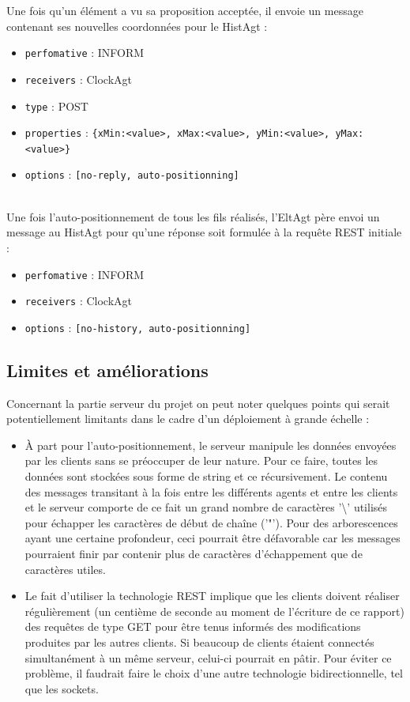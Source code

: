 Une fois qu'un élément a vu sa proposition acceptée, il envoie un message contenant ses nouvelles coordonnées pour le HistAgt :
\begin{itemize}
	\item \lstinline$perfomative$ : INFORM
	\item \lstinline$receivers$ : ClockAgt
	\item \lstinline$type$ : POST
	\item \lstinline$properties$ : \lstinline${xMin:<value>, xMax:<value>, yMin:<value>, yMax:<value>}$
	\item \lstinline$options$ : \lstinline$[no-reply, auto-positionning]$
\end{itemize}
~\\
Une fois l'auto-positionnement de tous les fils réalisés, l'EltAgt père envoi un message au HistAgt pour qu'une réponse soit formulée à la requête REST initiale :
\begin{itemize}
	\item \lstinline$perfomative$ : INFORM
	\item \lstinline$receivers$ : ClockAgt
	\item \lstinline$options$ : \lstinline$[no-history, auto-positionning]$
\end{itemize}

\subsection{Limites et améliorations}
Concernant la partie serveur du projet on peut noter quelques points qui serait potentiellement limitants dans le cadre d'un déploiement à grande échelle :
\begin{itemize}
	\item
	À part pour l'auto-positionnement, le serveur manipule les données envoyées par les clients sans se préoccuper de leur nature.
	Pour ce faire, toutes les données sont stockées sous forme de string et ce récursivement.
	Le contenu des messages transitant à la fois entre les différents agents et entre les clients et le serveur comporte de ce fait un grand nombre de caractères '\textbackslash' utilisés pour échapper les caractères de début de chaîne ('"').
	Pour des arborescences ayant une certaine profondeur, ceci pourrait être défavorable car les messages pourraient finir par contenir plus de caractères d'échappement que de caractères utiles.
	\item
	Le fait d'utiliser la technologie REST implique que les clients doivent réaliser régulièrement (un centième de seconde au moment de l'écriture de ce rapport) des requêtes de type GET pour être tenus informés des modifications produites par les autres clients.
	Si beaucoup de clients étaient connectés simultanément à un même serveur, celui-ci pourrait en pâtir.
	Pour éviter ce problème, il faudrait faire le choix d'une autre technologie bidirectionnelle, tel que les sockets.
\end{itemize}

